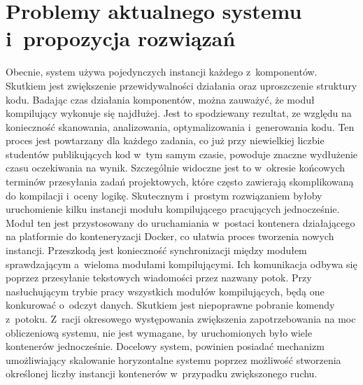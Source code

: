 \section{Problemy aktualnego systemu i~propozycja rozwiązań}
\indent Obecnie, system używa pojedynczych instancji każdego z~komponentów. Skutkiem jest zwiększenie przewidywalności działania oraz uproszczenie struktury kodu. Badając czas działania komponentów, można zauważyć, że moduł kompilujący wykonuje się najdłużej. Jest to spodziewany rezultat, ze względu na konieczność skanowania, analizowania, optymalizowania i~generowania kodu\cite{procesKompilacji}. Ten proces jest powtarzany dla każdego zadania, co już przy niewielkiej liczbie studentów publikujących kod w~tym samym czasie, powoduje znaczne wydłużenie czasu oczekiwania na wynik. Szczególnie widoczne jest to w~okresie końcowych terminów przesyłania zadań projektowych, które często zawierają skomplikowaną do kompilacji i~oceny logikę. Skutecznym i~prostym rozwiązaniem byłoby uruchomienie kilku instancji modułu kompilującego pracujących jednocześnie. Moduł ten jest przystosowany do uruchamiania w~postaci kontenera działającego na platformie do konteneryzacji Docker, co ułatwia proces tworzenia nowych instancji. Przeszkodą jest konieczność synchronizacji między modułem sprawdzającym a~wieloma modułami kompilującymi. Ich komunikacja odbywa się poprzez przesyłanie tekstowych wiadomości przez nazwany potok. Przy nasłuchującym trybie pracy wszystkich modułów kompilujących, będą one konkurować o~odczyt danych. Skutkiem jest niepoprawne pobranie komendy z~potoku. Z~racji okresowego występowania zwiększenia zapotrzebowania na moc obliczeniową systemu, nie jest wymagane, by uruchomionych było wiele kontenerów jednocześnie. Docelowy system, powinien posiadać mechanizm umożliwiający skalowanie horyzontalne systemu poprzez możliwość stworzenia określonej liczby instancji kontenerów w~przypadku zwiększonego ruchu.
